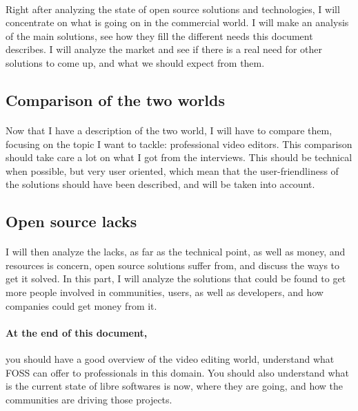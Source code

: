        \paragraph{}
            Right after analyzing the state of open source solutions and
            technologies, I will concentrate on what is going on in the commercial
            world. I will make an analysis of the main solutions, see how they
            fill the different needs this document describes. I will analyze the
            market and see if there is a real need for other solutions to come
            up, and what we should expect from them.

    \subsection{Comparison of the two worlds}
        \paragraph {}
            Now that I have a description of the two world, I will have to compare
            them, focusing on the topic I want to tackle: professional video
            editors. This comparison should take care a lot on what I got from
            the interviews. This should be technical when possible, but very user
            oriented, which mean that the user-friendliness of the solutions should have
            been described, and will be taken into account.

    \subsection{Open source lacks}
        \paragraph{}
            I will then analyze the lacks, as far as the technical point, as
            well as money, and resources is concern, open source solutions suffer from,
            and discuss the ways to get it solved. In this part, I will analyze
            the solutions that could be found to get more people involved in
            communities, users, as well as developers, and how companies could get
            money from it.

    \paragraph{At the end of this document,} you should have a good
        overview of the video editing world, understand what FOSS can offer to
        professionals in this domain. You should also understand what is the
        current state of libre softwares is now, where they are going, and how
        the communities are driving those projects.
